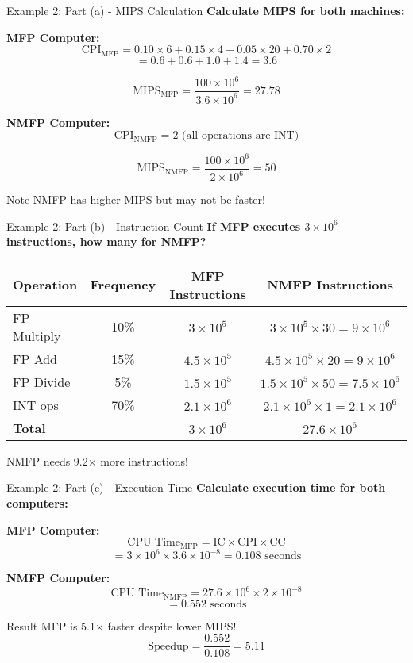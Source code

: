 \documentclass[aspectratio=169,12pt]{beamer}
\begin{document}
\begin{frame}{Example 2: Part (a) - MIPS Calculation}
\textbf{Calculate MIPS for both machines:}

\textbf{MFP Computer:}
$$\text{CPI}_{\text{MFP}} = 0.10 \times 6 + 0.15 \times 4 + 0.05 \times 20 + 0.70 \times 2$$
$$= 0.6 + 0.6 + 1.0 + 1.4 = 3.6$$

$$\text{MIPS}_{\text{MFP}} = \frac{100 \times 10^6}{3.6 \times 10^6} = 27.78$$

\textbf{NMFP Computer:}
$$\text{CPI}_{\text{NMFP}} = 2 \text{ (all operations are INT)}$$

$$\text{MIPS}_{\text{NMFP}} = \frac{100 \times 10^6}{2 \times 10^6} = 50$$

\begin{alertblock}{Note}
NMFP has higher MIPS but may not be faster!
\end{alertblock}
\end{frame}

\begin{frame}{Example 2: Part (b) - Instruction Count}
\textbf{If MFP executes $3 \times 10^6$ instructions, how many for NMFP?}

\begin{table}[h]
\centering
\small
\begin{tabular}{lccc}
\toprule
Operation & Frequency & MFP Instructions & NMFP Instructions \\
\midrule
FP Multiply & 10\% & $3 \times 10^5$ & $3 \times 10^5 \times 30 = 9 \times 10^6$ \\
FP Add & 15\% & $4.5 \times 10^5$ & $4.5 \times 10^5 \times 20 = 9 \times 10^6$ \\
FP Divide & 5\% & $1.5 \times 10^5$ & $1.5 \times 10^5 \times 50 = 7.5 \times 10^6$ \\
INT ops & 70\% & $2.1 \times 10^6$ & $2.1 \times 10^6 \times 1 = 2.1 \times 10^6$ \\
\midrule
\textbf{Total} & & $3 \times 10^6$ & $27.6 \times 10^6$ \\
\bottomrule
\end{tabular}
\end{table}

NMFP needs 9.2× more instructions!
\end{frame}

\begin{frame}{Example 2: Part (c) - Execution Time}
\textbf{Calculate execution time for both computers:}

\textbf{MFP Computer:}
$$\text{CPU Time}_{\text{MFP}} = \text{IC} \times \text{CPI} \times \text{CC}$$
$$= 3 \times 10^6 \times 3.6 \times 10^{-8} = 0.108 \text{ seconds}$$

\textbf{NMFP Computer:}
$$\text{CPU Time}_{\text{NMFP}} = 27.6 \times 10^6 \times 2 \times 10^{-8}$$
$$= 0.552 \text{ seconds}$$

\begin{block}{Result}
MFP is 5.1× faster despite lower MIPS!
$$\text{Speedup} = \frac{0.552}{0.108} = 5.11$$
\end{block}
\end{frame}
\end{document}
